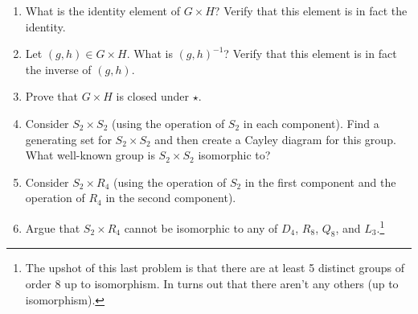 \documentclass[11pt]{article}
\theoremstyle{definition}
\begin{document}
\begin{enumerate}
\begin{enumerate}
\item What is the identity element of $G\times H$?  Verify that this element is in fact the identity.

\item Let $(g,h)\in G\times H$.  What is $(g,h)^{-1}$?  Verify that this element is in fact the inverse of $(g,h)$.

\item Prove that $G\times H$ is closed under $\star$.

\item Consider $S_2\times S_2$ (using the operation of $S_2$ in each component).  Find a generating set for $S_2\times S_2$ and then create a Cayley diagram for this group.  What well-known group is $S_2\times S_2$ isomorphic to?

\item Consider $S_2\times R_4$ (using the operation of $S_2$ in the first component and the operation of $R_4$ in the second component). 

\item Argue that $S_2\times R_4$ cannot be isomorphic to any of $D_4$, $R_8$, $Q_8$, and $L_3$.\footnote{The upshot of this last problem is that there are at least 5 distinct groups of order 8 up to isomorphism.  In turns out that there aren't any others (up to isomorphism).}

\end{enumerate}

\end{enumerate}
\end{document}
